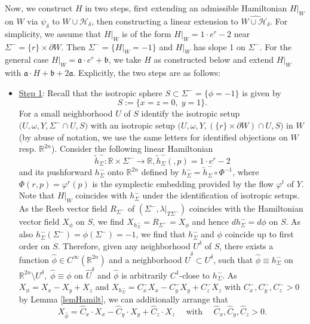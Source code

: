 \documentclass[a4paper,12pt,bibliography=totocnumbered,titlepage=false,abstracton,bookmarksnumbered=true]{scrartcl}
\theoremstyle{definition}
\begin{document}
Now, we construct $H$ in two steps, first extending an admissible Hamiltonian $H|_W$ on $W$ via $\psi_\delta$ to $W{\cup} \mathcal{H}_\delta$, then constructing a linear extension to $\widehat{W{\cup} \mathcal{H}_\delta}$. For simplicity, we assume that $H|_W$ is of the form $H|_W=1{\cdot} e^r-2$ near $\Sigma^-=\{r\}{\times}\partial W$. Then $\Sigma^-=\{H|_W=-1\}$ and $H|_W$ has slope 1 on $\Sigma^-$. For the general case $H|_W=\mathfrak{a}{\cdot} e^r+\mathfrak{b}$, we take $H$ as constructed below and extend $H|_W$ with $\mathfrak{a}{\cdot} H +\mathfrak{b}+2\mathfrak{a}$. Explicitly, the two steps are as follows:
\begin{itemize}
 \item \underline{Step 1}: Recall that the isotropic sphere $S\subset\Sigma^-=\{\phi=-1\}$ is given by
\[ S:=\{x{=}z{=}0,\; y=1\}.\]
For a small neighborhood $U$ of $S$ identify the isotropic setup $\big(U,\omega,Y,\Sigma^-\cap U,S\big)$ with an isotropic setup $\big(U,\omega,Y,(\{r\}{\times}\partial W)\cap U,S\big)$ in $W$ (by abuse of notation, we use the same letters for identified objections on $W$ resp. $\mathbb{R}^{2n}$). Consider the following linear Hamiltonian \[\tilde{h}^-_\Sigma:\mathbb{R}\times\Sigma^-\rightarrow\mathbb{R}, \tilde{h}_\Sigma^-(,p)=1{\cdot} e^r-2\]
and its pushforward $h_\Sigma^-$ onto $\mathbb{R}^{2n}$ defined by $h^-_\Sigma=\tilde{h}_\Sigma^-\circ \Phi^{-1}$, where $\Phi(r,p)=\varphi^r(p)$ is the symplectic embedding provided by the flow $\varphi^t$ of $Y$. Note that $H|_W$ coincides with $h_\Sigma^-$ under the identification of isotropic setups.\\
As the Reeb vector field $R_{\Sigma^-}$ of $(\Sigma^-,\lambda|_{T\Sigma^-})$ coincides with the Hamiltonian vector field $X_\phi$ on $S$, we find $X_{h_\Sigma^-}=R_{\Sigma^-}=X_\phi$ and hence $dh_\Sigma^-=d\phi$ on $S$. As also $h_\Sigma^-(\Sigma^-)=\phi(\Sigma^-)=-1$, we find that $h_\Sigma^-$ and $\phi$ coincide up to first order on $S$. Therefore, given any neighborhood $U^\delta$ of $S$, there exists a function $\hat{\phi}\in C^\infty(\mathbb{R}^{2n})$ and a neighborhood $\hat{U}^\delta\subset U^\delta$, such that $\hat{\phi}\equiv h_\Sigma^-$ on $\mathbb{R}^{2n}\setminus U^\delta,\; \hat{\phi}\equiv\phi$ on $\hat{U}^\delta$ and $\hat{\phi}$ is arbitrarily $C^1$-close to $h_{\Sigma}^-$. As $X_\phi=X_x-X_y+X_z$ and $X_{h_\Sigma^-}=C_x^- X_x-C_y^- X_y+C_z^- X_z$ with $C_x^-,C_y^-,C_z^->0$ by Lemma \ref{lemHamilt}, we can additionally arrange that
\[X_{\hat{\phi}} = \hat{C}_x{\cdot} X_x - \hat{C}_y{\cdot} X_y + \hat{C}_z{\cdot} X_z\quad\text{ with }\quad \hat{C}_x,\hat{C}_y,\hat{C}_z>0.\]

\end{itemize}
\end{document}
